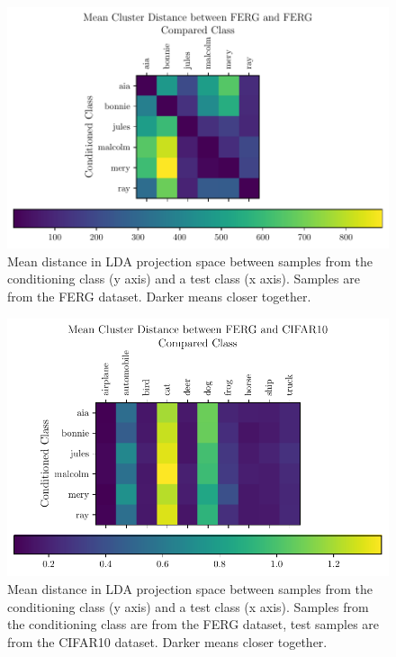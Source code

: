 \begin{figure}[htpb]
	\centering
	\includegraphics{figures/samples/ferg_distance_matrix_ferg_lda.pdf}
	\caption{Mean distance in LDA projection space between samples from the
		conditioning class (y axis) and a test class (x axis). Samples
		are from the FERG dataset. Darker means closer together.}%
	\label{fig:ferg_distance_matrix}
\end{figure}

\begin{figure}[htpb]
	\centering
	\includegraphics{figures/samples/ferg_distance_matrix_cifar_lda.pdf}
	\caption{Mean distance in LDA projection space between samples from the
		conditioning class (y axis) and a test class (x axis). Samples
		from the conditioning class are from the FERG dataset, test
		samples are from the CIFAR10 dataset. Darker means closer
		together.}%
	\label{fig:ferg_distance_matrix_cifar}
\end{figure}


